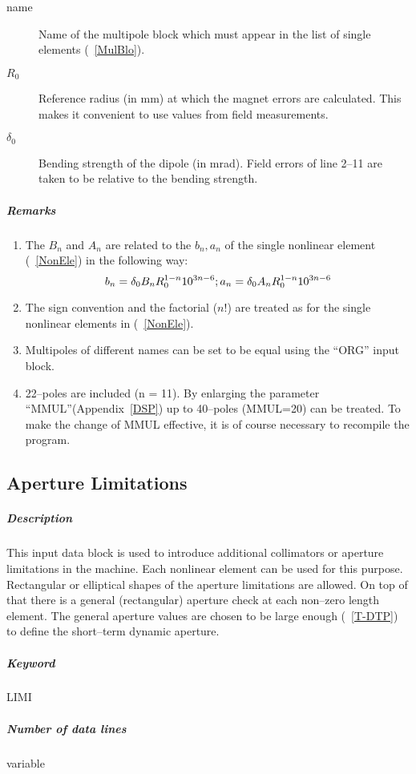 \documentclass[a4paper,11pt]{report}
\begin{document}
\begin{description}
\item [name] Name of the multipole block which must appear in the list
  of single elements (~\ref{MulBlo}).
\item [$ R_{0} $] Reference radius (in mm) at which the magnet errors
  are calculated.  This makes it convenient to use values from field
  measurements.
\item [$ \delta_{0} $] Bending strength of the dipole (in mrad). Field
  errors of line 2--11 are taken to be relative to the bending
  strength.
\end{description}

\subparagraph{Remarks}
\begin{enumerate}
\item The $ B_{n} $ and $ A_{n} $ are related to the $ b_{n}, a_{n} $
  of the single nonlinear element (~\ref{NonEle}) in the following
  way:
  $$
  b_{n} = \delta_{0} B_{n} R_{0}^{1-n} 10^{3n-6}; \\
  a_{n} = \delta_{0} A_{n} R_{0}^{1-n} 10^{3n-6}
  $$
\item The sign convention and the factorial ($n$!) are treated as for
  the single nonlinear elements in (~\ref{NonEle}).
\item Multipoles of different names can be set to be equal using the
  ``ORG'' input block.
\item 22--poles are included (n = 11). By enlarging the parameter
  ``MMUL''(Appendix~\ref{DSP}) up to 40--poles (MMUL=20) can be
  treated. To make the change of MMUL effective, it is of course
  necessary to recompile the program.
\end{enumerate}

\subsection{Aperture Limitations} \label{ApeLim}

\subparagraph{Description} This input data block is used to introduce
additional collimators or aperture limitations in the machine.  Each
nonlinear element can be used for this purpose. Rectangular or
elliptical shapes of the aperture limitations are allowed. On top of
that there is a general (rectangular) aperture check at each non--zero
length element. The general aperture values are chosen to be large
enough (~\ref{T-DTP}) to define the short--term dynamic aperture.

\subparagraph{Keyword} LIMI \subparagraph{Number of data lines}
variable
\end{document}
